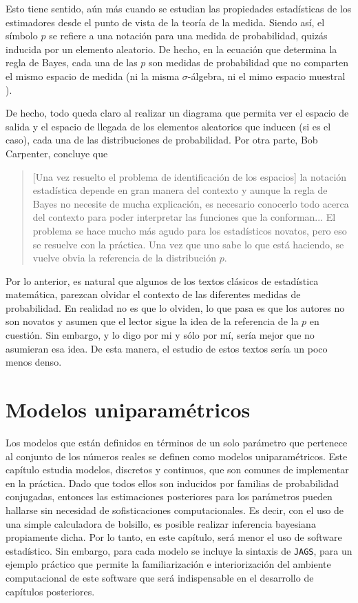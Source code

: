 \documentclass[10pt,openright]{book}\usepackage[]{graphicx}\usepackage[]{color}
\begin{document}
Esto tiene sentido, aún más cuando se estudian las propiedades estadísticas de los estimadores desde el punto de vista de la teoría de la medida. Siendo así, el símbolo $p$ se refiere a una notación para una medida de probabilidad, quizás inducida por un elemento aleatorio. De hecho, en la ecuación que determina la regla de Bayes, cada una de las $p$ son medidas de probabilidad que no comparten el mismo espacio de medida (ni la misma $ \sigma$-álgebra, ni el mimo espacio muestral ).

De hecho, todo queda claro al realizar un diagrama que permita ver el espacio de salida y el espacio de llegada de los elementos aleatorios que inducen (si es el caso), cada una de las distribuciones de probabilidad. Por otra parte, Bob Carpenter, concluye que

\begin{quote}
[Una vez resuelto el problema de identificación de los espacios] la notación estadística depende en gran manera del contexto y aunque la regla de Bayes no necesite de mucha explicación, es necesario conocerlo todo acerca del contexto para poder interpretar las funciones que la conforman... El problema se hace mucho más agudo para los estadísticos novatos, pero eso se resuelve con la práctica. Una vez que uno sabe lo que está haciendo, se vuelve obvia la referencia de la distribución $ p$.
\end{quote}

Por lo anterior, es natural que algunos de los textos clásicos de estadística matemática, parezcan olvidar el contexto de las diferentes medidas de probabilidad. En realidad no es que lo olviden, lo que pasa es que los autores no son novatos y asumen que el lector sigue la idea de la referencia de la $ p$ en cuestión. Sin embargo, y lo digo por mi y sólo por mí, sería mejor que no asumieran esa idea. De esta manera, el estudio de estos textos sería un poco menos denso.


  
  \chapter{Modelos uniparam\'etricos}

    
  Los modelos que est\'an definidos en t\'erminos de un solo par\'ametro que pertenece al conjunto de los n\'umeros reales se definen como modelos uniparam\'etricos. Este cap\'itulo estudia modelos, discretos y continuos, que son comunes de implementar en la pr\'actica. Dado que todos ellos son inducidos por familias de probabilidad conjugadas, entonces las estimaciones posteriores para los par\'ametros pueden hallarse sin necesidad de sofisticaciones computacionales. Es decir, con el uso de una simple calculadora de bolsillo, es posible realizar inferencia bayesiana propiamente dicha. Por lo tanto, en este cap\'itulo, ser\'a menor el uso de software estad\'istico. Sin embargo, para cada modelo se incluye la sintaxis de \texttt{JAGS}, para un ejemplo pr\'actico que permite la familiarizaci\'on e interiorizaci\'on del ambiente computacional de este software que ser\'a indispensable en el desarrollo de cap\'itulos posteriores.
    
\end{document}
